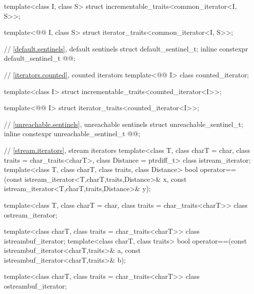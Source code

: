 \begin{codeblock}
{  template<class I, class S>
    struct incrementable_traits<common_iterator<I, S>>;

  template<@@ I, class S>
    struct iterator_traits<common_iterator<I, S>>;

  // \ref{default.sentinels}, default sentinels
  struct default_sentinel_t;
  inline constexpr default_sentinel_t @@{};

  // \ref{iterators.counted}, counted iterators
  template<@@ I> class counted_iterator;

  template<class I>
    struct incrementable_traits<counted_iterator<I>>;

  template<@@ I>
    struct iterator_traits<counted_iterator<I>>;

  // \ref{unreachable.sentinels}, unreachable sentinels
  struct unreachable_sentinel_t;
  inline constexpr unreachable_sentinel_t @@{};

  // \ref{stream.iterators}, stream iterators
  template<class T, class charT = char, class traits = char_traits<charT>,
           class Distance = ptrdiff_t>
  class istream_iterator;
  template<class T, class charT, class traits, class Distance>
    bool operator==(const istream_iterator<T,charT,traits,Distance>& x,
            const istream_iterator<T,charT,traits,Distance>& y);

  template<class T, class charT = char, class traits = char_traits<charT>>
      class ostream_iterator;

  template<class charT, class traits = char_traits<charT>>
    class istreambuf_iterator;
  template<class charT, class traits>
    bool operator==(const istreambuf_iterator<charT,traits>& a,
            const istreambuf_iterator<charT,traits>& b);

  template<class charT, class traits = char_traits<charT>>
    class ostreambuf_iterator;

}
\end{codeblock}
